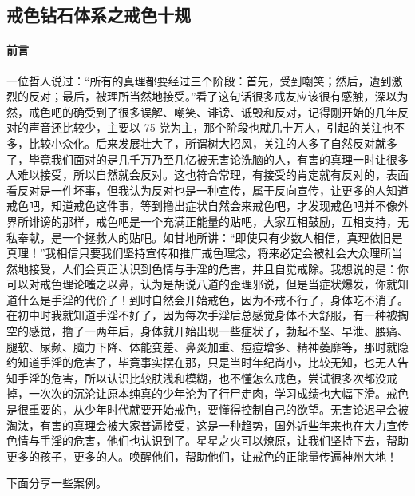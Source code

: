\subsection{戒色钻石体系之戒色十规}

\paragraph{前言}

一位哲人说过：“所有的真理都要经过三个阶段：首先，受到嘲笑；然后，遭到激烈的反对；最后，被理所当然地接受。”看了这句话很多戒友应该很有感触，深以为然，戒色吧的确受到了很多误解、嘲笑、诽谤、诋毁和反对，记得刚开始的几年反对的声音还比较少，主要以 75 党为主，那个阶段也就几十万人，引起的关注也不多，比较小众化。后来发展壮大了，所谓树大招风，关注的人多了自然反对就多了，毕竟我们面对的是几千万乃至几亿被无害论洗脑的人，有害的真理一时让很多人难以接受，所以自然就会反对。这也符合常理，有接受的肯定就有反对的，表面看反对是一件坏事，但我认为反对也是一种宣传，属于反向宣传，让更多的人知道戒色吧，知道戒色这件事，等到撸出症状自然会来戒色吧，才发现戒色吧并不像外界所诽谤的那样，戒色吧是一个充满正能量的贴吧，大家互相鼓励，互相支持，无私奉献，是一个拯救人的贴吧。如甘地所讲：“即使只有少数人相信，真理依旧是真理！”我相信只要我们坚持宣传和推广戒色理念，将来必定会被社会大众理所当然地接受，人们会真正认识到色情与手淫的危害，并且自觉戒除。我想说的是：你可以对戒色理论嗤之以鼻，认为是胡说八道的歪理邪说，但是当症状爆发，你就知道什么是手淫的代价了！到时自然会开始戒色，因为不戒不行了，身体吃不消了。在初中时我就知道手淫不好了，因为每次手淫后总感觉身体不大舒服，有一种被掏空的感觉，撸了一两年后，身体就开始出现一些症状了，勃起不坚、早泄、腰痛、腿软、尿频、脑力下降、体能变差、鼻炎加重、痘痘增多、精神萎靡等，那时就隐约知道手淫的危害了，毕竟事实摆在那，只是当时年纪尚小，比较无知，也无人告知手淫的危害，所以认识比较肤浅和模糊，也不懂怎么戒色，尝试很多次都没戒掉，一次次的沉沦让原本纯真的少年沦为了行尸走肉，学习成绩也大幅下滑。戒色是很重要的，从少年时代就要开始戒色，要懂得控制自己的欲望。无害论迟早会被淘汰，有害的真理会被大家普遍接受，这是一种趋势，国外近些年来也在大力宣传色情与手淫的危害，他们也认识到了。星星之火可以燎原，让我们坚持下去，帮助更多的孩子，更多的人。唤醒他们，帮助他们，让戒色的正能量传遍神州大地！

下面分享一些案例。

